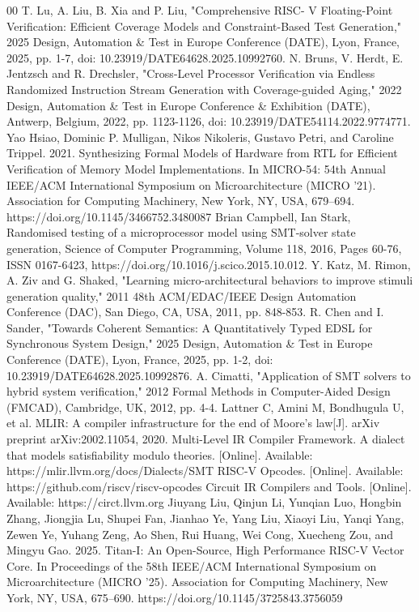\documentclass[sigconf]{acmart}
\begin{document}
\begin{thebibliography}{00}
 T. Lu, A. Liu, B. Xia and P. Liu, "Comprehensive RISC- V Floating-Point Verification: Efficient Coverage Models and Constraint-Based Test Generation," 2025 Design, Automation \& Test in Europe Conference (DATE), Lyon, France, 2025, pp. 1-7, doi: 10.23919/DATE64628.2025.10992760.
 N. Bruns, V. Herdt, E. Jentzsch and R. Drechsler, "Cross-Level Processor Verification via Endless Randomized Instruction Stream Generation with Coverage-guided Aging," 2022 Design, Automation \& Test in Europe Conference \& Exhibition (DATE), Antwerp, Belgium, 2022, pp. 1123-1126, doi: 10.23919/DATE54114.2022.9774771.
 Yao Hsiao, Dominic P. Mulligan, Nikos Nikoleris, Gustavo Petri, and Caroline Trippel. 2021. Synthesizing Formal Models of Hardware from RTL for Efficient Verification of Memory Model Implementations. In MICRO-54: 54th Annual IEEE/ACM International Symposium on Microarchitecture (MICRO '21). Association for Computing Machinery, New York, NY, USA, 679–694. https://doi.org/10.1145/3466752.3480087
 Brian Campbell, Ian Stark, Randomised testing of a microprocessor model using SMT-solver state generation, Science of Computer Programming, Volume 118, 2016, Pages 60-76, ISSN 0167-6423, https://doi.org/10.1016/j.scico.2015.10.012.
 Y. Katz, M. Rimon, A. Ziv and G. Shaked, "Learning micro-architectural behaviors to improve stimuli generation quality," 2011 48th ACM/EDAC/IEEE Design Automation Conference (DAC), San Diego, CA, USA, 2011, pp. 848-853.
 R. Chen and I. Sander, "Towards Coherent Semantics: A Quantitatively Typed EDSL for Synchronous System Design," 2025 Design, Automation \& Test in Europe Conference (DATE), Lyon, France, 2025, pp. 1-2, doi: 10.23919/DATE64628.2025.10992876.
 A. Cimatti, "Application of SMT solvers to hybrid system verification," 2012 Formal Methods in Computer-Aided Design (FMCAD), Cambridge, UK, 2012, pp. 4-4.
 Lattner C, Amini M, Bondhugula U, et al. MLIR: A compiler infrastructure for the end of Moore's law[J]. arXiv preprint arXiv:2002.11054, 2020.
 Multi-Level IR Compiler Framework. A dialect that models satisfiability modulo theories. [Online]. Available: https://mlir.llvm.org/docs/Dialects/SMT
 RISC-V Opcodes. [Online]. Available: https://github.com/riscv/riscv-opcodes
 Circuit IR Compilers and Tools. [Online]. Available: https://circt.llvm.org
 Jiuyang Liu, Qinjun Li, Yunqian Luo, Hongbin Zhang, Jiongjia Lu, Shupei Fan, Jianhao Ye, Yang Liu, Xiaoyi Liu, Yanqi Yang, Zewen Ye, Yuhang Zeng, Ao Shen, Rui Huang, Wei Cong, Xuecheng Zou, and Mingyu Gao. 2025. Titan-I: An Open-Source, High Performance RISC-V Vector Core. In Proceedings of the 58th IEEE/ACM International Symposium on Microarchitecture (MICRO '25). Association for Computing Machinery, New York, NY, USA, 675–690. https://doi.org/10.1145/3725843.3756059

\end{thebibliography}
\end{document}
